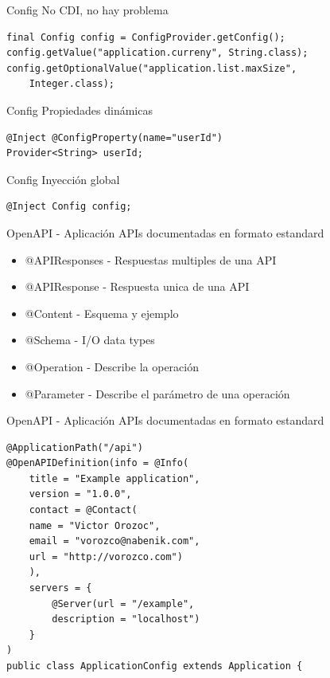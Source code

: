 \documentclass[aspectratio=169]{beamer}
\begin{document}
\begin{frame}[fragile]{Config}
No CDI, no hay problema
\begin{lstlisting}
final Config config = ConfigProvider.getConfig();
config.getValue("application.curreny", String.class);
config.getOptionalValue("application.list.maxSize",
	Integer.class);
\end{lstlisting}
\end{frame}

\begin{frame}[fragile]{Config}
Propiedades dinámicas
\begin{lstlisting}
@Inject @ConfigProperty(name="userId")
Provider<String> userId;
\end{lstlisting}
\end{frame}

\begin{frame}[fragile]{Config}
Inyección global
\begin{lstlisting}
@Inject Config config;
\end{lstlisting}
\end{frame}

\begin{frame}[fragile]{OpenAPI - Aplicación}
APIs documentadas en formato estandard

\begin{itemize}
	\item @APIResponses - Respuestas multiples de una API
	\item @APIResponse - Respuesta unica de una API
	\item @Content - Esquema y ejemplo
	\item @Schema - I/O data types
	\item @Operation - Describe la operación
	\item @Parameter - Describe el parámetro de una operación
\end{itemize}

\end{frame}

\begin{frame}[fragile]{OpenAPI - Aplicación}
APIs documentadas en formato estandard
\begin{lstlisting}
@ApplicationPath("/api")
@OpenAPIDefinition(info = @Info(
	title = "Example application",
	version = "1.0.0",
	contact = @Contact(
	name = "Victor Orozoc",
	email = "vorozco@nabenik.com",
	url = "http://vorozco.com")
	),
	servers = {
		@Server(url = "/example",
		description = "localhost")
	}
)
public class ApplicationConfig extends Application {
\end{lstlisting}
\end{frame}
\end{document}
